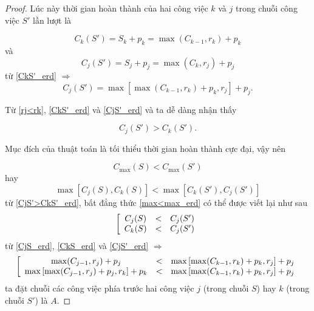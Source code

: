 \begin{proof}
	Lúc này thời gian hoàn thành của hai công việc $k$ và $j$ trong chuỗi công việc $S'$ lần lượt là
	
	\begin{equation} \label{CkS'_erd}
		C_k(S') = S_k + p_k = \max (C_{k-1} , r_k ) + p_k
	\end{equation}
	và
	\begin{equation} \label{CjS'_erd}
		C_j(S') = S_j + p_j = \max (C_k , r_j ) + p_j
	\end{equation}
	từ \eqref{CkS'_erd}
	$\Rightarrow$
	\begin{equation} \label{CjS'_erd}
		C_j(S') = \max \left[ \max (C_{k-1} , r_k) + p_k , r_j \right] +p_j.
	\end{equation}

	Từ \eqref{rj<rk}, \eqref{CkS'_erd} và \eqref{CjS'_erd} và  ta dễ dàng nhận thấy

	\begin{equation} \label{CjS'>CkS'_erd}
		C_j(S') > C_k(S').
	\end{equation}

	Mục đích của thuật toán là tối thiểu thời gian hoàn thành cực đại, vậy nên

	\begin{equation} \label{C<C}
		C_{\max}(S) < C_{\max}(S')
	\end{equation}
	hay
	\begin{equation} \label{max<max_erd}
	\max \left[ C_j(S), C_k(S) \right] < \max \left[ C_k(S'), C_j(S') \right] 
	\end{equation}
	từ \eqref{CjS'>CkS'_erd}, bất đẳng thức \eqref{max<max_erd} có thể được viết lại như sau
	\begin{equation}
		\left[
			\begin{array}{c c c}
				C_j(S) &<& C_j(S') \\
				C_k(S) &<& C_j(S')
			\end{array}
		\right.
	\end{equation}
	từ \eqref{CjS_erd}, \eqref{CkS_erd} và \eqref{CjS'_erd}
	$\Rightarrow$
	\begin{equation} \label{hbdt_erd}
		\left[
			\begin{array}{c c c}
				\max (C_{j-1}, r_j) + p_j &<& \max \left[ \max (C_{k-1}, r_k) + p_k, r_j \right] + p_j \\
				\max \left[ \max (C_{j-1}, r_j) + p_j, r_k \right] + p_k &<& \max \left[ \max (C_{k-1}, r_k) + p_k, r_j \right] + p_j
			\end{array}
		\right.
	\end{equation}
	ta đặt chuỗi các công việc phía trước hai công việc $j$ (trong chuỗi $S$) hay $k$ (trong chuỗi $S'$) là $A$.
	

\end{proof}
